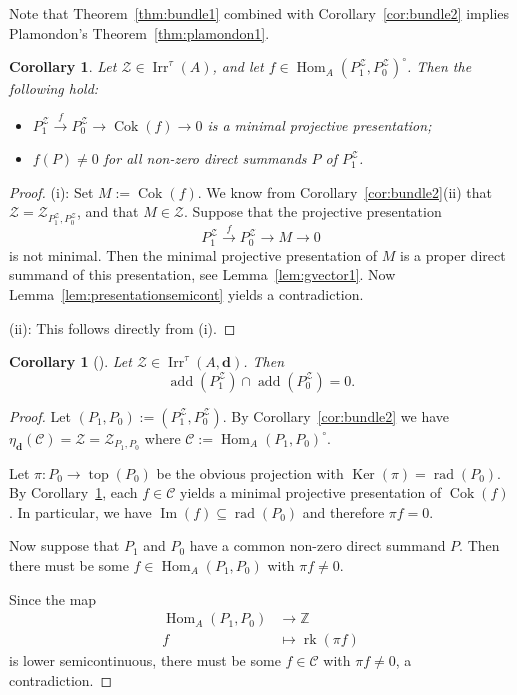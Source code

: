 \documentclass[12pt,reqno]{amsart}
\newtheorem{Cor}[Thm]{Corollary}
\theoremstyle{definition}
\newcommand{\Z}{\mathbb{Z}}
\newcommand{\df}{\colon}
\newcommand{\cC}{{\mathcal C}}
\newcommand{\bd}{\mathbf{d}}
\newcommand{\rk}{\operatorname{rk}}
\newcommand{\add}{\operatorname{add}}
\newcommand{\rad}{\operatorname{rad}}
\newcommand{\tp}{\operatorname{top}}
\newcommand{\Hom}{\operatorname{Hom}}
\newcommand{\Ima}{\operatorname{Im}}
\newcommand{\Ker}{\operatorname{Ker}}
\newcommand{\Coker}{\operatorname{Cok}}
\newcommand{\irr}{\operatorname{Irr}}
\newcommand{\calZ}{\mathcal{Z}}
\begin{document}
Note that Theorem~\ref{thm:bundle1} combined with
Corollary~\ref{cor:bundle2} implies Plamondon's Theorem~\ref{thm:plamondon1}.

\begin{Cor}\label{cor:bundle3}
Let $\calZ \in \irr^\tau(A)$, and let
$f \in \Hom_A(P_1^{\calZ},P_0^{\calZ})^\circ$.
Then the following hold:
\begin{itemize}\itemsep2mm

\item[(i)]
$P_1^{\calZ} \xrightarrow{f} P_0^{\calZ} \to \Coker(f) \to 0$
is a minimal projective presentation;

\item[(ii)]
$f(P) \not= 0$ for all non-zero direct summands $P$ of $P_1^{\calZ}$.

\end{itemize}
\end{Cor}

\begin{proof}
(i):
Set $M := \Coker(f)$.
We know from Corollary~\ref{cor:bundle2}(ii) that $\calZ = \calZ_{P_1^{\calZ},P_0^{\calZ}}$, and that
$M \in \calZ$.
Suppose that the projective presentation
$$
P_1^{\calZ} \xrightarrow{f} P_0^{\calZ} \to M \to 0
$$
is not minimal.
Then the minimal projective presentation of $M$ is a proper
direct summand of this presentation, see
Lemma~\ref{lem:gvector1}.
Now Lemma~\ref{lem:presentationsemicont} yields a contradiction.

(ii):
This follows directly from (i).
\end{proof}



\begin{Cor}[{\cite[Corollary~2.17]{P13}}]\label{cor:bundle4}
Let $\calZ \in \irr^\tau(A,\bd)$.
Then
$$
\add(P_1^{\calZ}) \cap \add(P_0^{\calZ}) = 0.
$$
\end{Cor}

\begin{proof}
Let $(P_1,P_0) := (P_1^\calZ,P_0^\calZ)$.
By Corollary~\ref{cor:bundle2}
we have $\eta_\bd(\cC) = \calZ = \calZ_{P_1,P_0}$ where
$\cC := \Hom_A(P_1,P_0)^\circ$.

Let $\pi\df P_0 \to \tp(P_0)$ be the obvious projection
with $\Ker(\pi) = \rad(P_0)$.
By Corollary~\ref{cor:bundle3},
each $f \in \cC$ yields a minimal projective presentation
of $\Coker(f)$.
In particular, we have $\Ima(f) \subseteq \rad(P_0)$ and
therefore $\pi f = 0$.

Now suppose that $P_1$ and $P_0$ have a common non-zero
direct summand $P$.
Then there must be some $f \in \Hom_A(P_1,P_0)$ with
$\pi f \not= 0$.

Since the map
\begin{align*}
\Hom_A(P_1,P_0) &\to \Z
\\
f &\mapsto \rk(\pi f)
\end{align*}
is lower semicontinuous, there must be some $f \in \cC$ with
$\pi f \not= 0$, a contradiction.
\end{proof}
\end{document}
